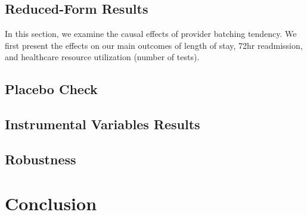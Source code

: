 \documentclass[,,nonblindrev]{informs}
\begin{document}
\hypertarget{reduced-form-results}{%
\subsection{Reduced-Form Results}\label{reduced-form-results}}

In this section, we examine the causal effects of provider batching
tendency. We first present the effects on our main outcomes of length of
stay, 72hr readmission, and healthcare resource utilization (number of
tests).

\hypertarget{placebo-check}{%
\subsection{Placebo Check}\label{placebo-check}}

\hypertarget{instrumental-variables-results}{%
\subsection{Instrumental Variables
Results}\label{instrumental-variables-results}}

\hypertarget{robustness}{%
\subsection{Robustness}\label{robustness}}

\hypertarget{conclusion}{%
\section{Conclusion}\label{conclusion}}

\clearpage
\end{document}
